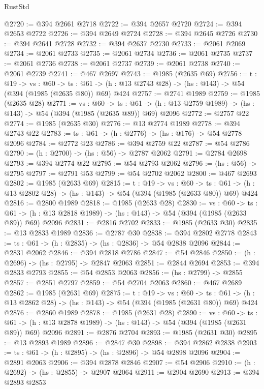 \begin{lexlean}{RustStd}
\begin{coremodule}
@2720 := @394 @2661 @2718
@2722 := @394 @2657 @2720
@2724 := @394 @2653 @2722
@2726 := @394 @2649 @2724
@2728 := @394 @2645 @2726
@2730 := @394 @2641 @2728
@2732 := @394 @2637 @2730
@2733 := @2061 @2069
@2734 := @2061 @2733
@2735 := @2061 @2734
@2736 := @2061 @2735
@2737 := @2061 @2736
@2738 := @2061 @2737
@2739 := @2061 @2738
@2740 := @2061 @2739
@2741 := @467 @2697
@2743 := @1985 (@2635 @69)
@2756 := {t : @19} ->
  {vs : @60} ->
  {ts : @61} -> (h : @13 @2743 @28) -> (hs : @143) -> @54 (@394 (@1985 (@2635 @80)) @69) @424
@2757 := @2741 @1989
@2759 := @1985 (@2635 @28)
@2771 := {vs : @60} ->
  {ts : @61} -> (h : @13 @2759 @1989) -> (hs : @143) -> @54 (@394 (@1985 (@2635 @89)) @69) @2096
@2772 := @2757 @22
@2774 := @1985 (@2635 @30)
@2776 := @13 @2774 @1989
@2778 := @394 @2743 @22
@2783 := {ts : @61} -> (h : @2776) -> (hs : @176) -> @54 @2778 @2096
@2784 := @2772 @23
@2786 := @394 @2759 @22
@2787 := @54 @2786
@2790 := (h : @2700) -> (hs : @56) -> @2787 @2062
@2791 := @2784 @2698
@2793 := @394 @2774 @22
@2795 := @54 @2793 @2062
@2796 := (hs : @56) -> @2795
@2797 := @2791 @53
@2799 := @54 @2702 @2062
@2800 := @467 @2693
@2802 := @1985 (@2633 @69)
@2815 := {t : @19} ->
  {vs : @60} ->
  {ts : @61} -> (h : @13 @2802 @28) -> (hs : @143) -> @54 (@394 (@1985 (@2633 @80)) @69) @424
@2816 := @2800 @1989
@2818 := @1985 (@2633 @28)
@2830 := {vs : @60} ->
  {ts : @61} -> (h : @13 @2818 @1989) -> (hs : @143) -> @54 (@394 (@1985 (@2633 @89)) @69) @2096
@2831 := @2816 @2702
@2833 := @1985 (@2633 @30)
@2835 := @13 @2833 @1989
@2836 := @2787 @30
@2838 := @394 @2802 @2778
@2843 := {ts : @61} -> (h : @2835) -> (hs : @2836) -> @54 @2838 @2096
@2844 := @2831 @2062
@2846 := @394 @2818 @2786
@2847 := @54 @2846
@2850 := (h : @2696) -> (hs : @2795) -> @2847 @2063
@2851 := @2844 @2694
@2853 := @394 @2833 @2793
@2855 := @54 @2853 @2063
@2856 := (hs : @2799) -> @2855
@2857 := @2851 @2797
@2859 := @54 @2704 @2063
@2860 := @467 @2689
@2862 := @1985 (@2631 @69)
@2875 := {t : @19} ->
  {vs : @60} ->
  {ts : @61} -> (h : @13 @2862 @28) -> (hs : @143) -> @54 (@394 (@1985 (@2631 @80)) @69) @424
@2876 := @2860 @1989
@2878 := @1985 (@2631 @28)
@2890 := {vs : @60} ->
  {ts : @61} -> (h : @13 @2878 @1989) -> (hs : @143) -> @54 (@394 (@1985 (@2631 @89)) @69) @2096
@2891 := @2876 @2704
@2893 := @1985 (@2631 @30)
@2895 := @13 @2893 @1989
@2896 := @2847 @30
@2898 := @394 @2862 @2838
@2903 := {ts : @61} -> (h : @2895) -> (hs : @2896) -> @54 @2898 @2096
@2904 := @2891 @2063
@2906 := @394 @2878 @2846
@2907 := @54 @2906
@2910 := (h : @2692) -> (hs : @2855) -> @2907 @2064
@2911 := @2904 @2690
@2913 := @394 @2893 @2853

\end{coremodule}
\end{lexlean}

